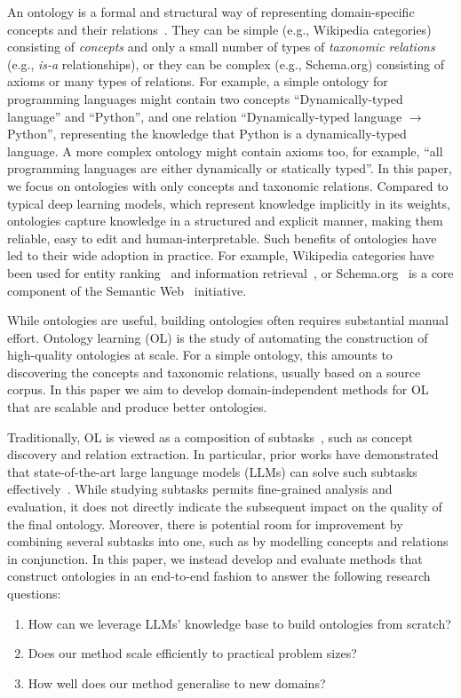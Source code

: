 \documentclass{article}
\begin{document}
An ontology is a formal and structural way of representing domain-specific concepts and their relations~\cite{gruber1995toward}.
They can be simple (e.g., Wikipedia categories) consisting of \emph{concepts} and only a small number of types of \emph{taxonomic relations} (e.g., \emph{is-a} relationships), or they can be complex (e.g., Schema.org) consisting of axioms or many types of relations. For example, a simple ontology for programming languages might contain two concepts ``Dynamically-typed language'' and ``Python'', and one relation ``Dynamically-typed language $\to$ Python'', representing the knowledge that Python is a dynamically-typed language. A more complex ontology might contain axioms too, for example, ``all programming languages are either dynamically or statically typed''.
In this paper, we focus on ontologies with only concepts and taxonomic relations. Compared to typical deep learning models, which represent knowledge implicitly in its weights, ontologies capture knowledge in a structured and explicit manner, making them reliable, easy to edit and human-interpretable. Such benefits of ontologies have led to their wide adoption in practice. For example, Wikipedia categories have been used for entity ranking~\cite{vercoustre2008using} and information retrieval~\cite{sorg2012exploiting}, or Schema.org~\cite{Schema.org_2011} is a core component of the Semantic Web~\cite{antoniou2004semantic} initiative.

While ontologies are useful, building ontologies often requires substantial manual effort. Ontology learning (OL) is the study of automating the construction of high-quality ontologies at scale. For a simple ontology, this amounts to discovering the concepts and taxonomic relations, usually based on a source corpus. In this paper we aim to develop domain-independent methods for OL that are scalable and produce better ontologies.

Traditionally, OL is viewed as a composition of subtasks~\cite{asim2018survey}, such as concept discovery and relation extraction. In particular, prior works have demonstrated that state-of-the-art large language models (LLMs) can solve such subtasks effectively~\cite{babaei2023llms4ol}. While studying subtasks permits fine-grained analysis and evaluation, it does not directly indicate the subsequent impact on the quality of the final ontology. Moreover, there is potential room for improvement by combining several subtasks into one, such as by modelling concepts and relations in conjunction. In this paper, we instead develop and evaluate methods that construct ontologies in an end-to-end fashion to answer the following research questions:
\begin{enumerate}[itemsep=0pt,leftmargin=*]
    \item How can we leverage LLMs' knowledge base to build ontologies from scratch?
    \item Does our method scale efficiently to practical problem sizes?
    \item How well does our method generalise to new domains?
\end{enumerate}
\end{document}
